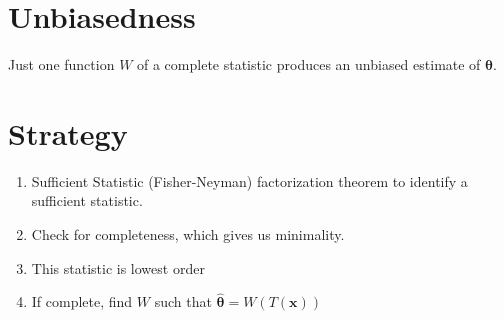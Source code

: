 \documentclass[a4paper]{article}
\begin{document}
\section*{Unbiasedness}%
Just one function $W$ of a complete statistic produces an unbiased estimate of $\bm{\theta}$.

\section*{Strategy}
\begin{enumerate}
  \item Sufficient Statistic (Fisher-Neyman) factorization theorem to identify a sufficient statistic.
  \item Check for completeness, which gives us minimality.
  \item This statistic is lowest order
  \item If complete, find $W$ such that $\hat{\bm{\theta}} = W(T(\mathbf{x}))$
\end{enumerate}
\end{document}
